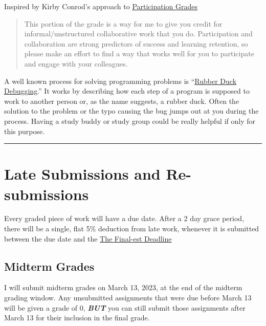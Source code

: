 \documentclass[
  letterpaper,
  DIV=11,
  numbers=noendperiod]{scrartcl}
\begin{document}
Inspired by Kirby Conrod's approach to
\href{https://kconrod.medium.com/new-ways-of-encouraging-and-assessing-participation-81928518e518}{Participation
Grades}

\begin{quote}
This portion of the grade is a way for me to give you credit for
informal/unstructured collaborative work that you do. Participation and
collaboration are strong predictors of success and learning retention,
so please make an effort to find a way that works well for you to
participate and engage with your colleagues.
\end{quote}

A well known process for solving programming problems is
``\href{https://en.wikipedia.org/w/index.php?title=Rubber_duck_debugging\&oldid=1111165654}{Rubber
Duck Debugging}.'' It works by describing how each step of a program is
supposed to work to another person or, as the name suggests, a rubber
duck. Often the solution to the problem or the typo causing the bug
jumps out at you during the process. Having a study buddy or study group
could be really helpful if only for this purpose.

\begin{center}\rule{0.5\linewidth}{0.5pt}\end{center}

\hypertarget{late-submissions-and-re-submissions}{%
\section{Late Submissions and
Re-submissions}\label{late-submissions-and-re-submissions}}

Every graded piece of work will have a due date. After a 2 day grace
period, there will be a single, flat 5\% deduction from late work,
whenever it is submitted between the due date and the
\protect\hyperlink{the-final-est-deadline}{The Final-est Deadline}

\hypertarget{midterm-grades}{%
\subsection{Midterm Grades}\label{midterm-grades}}

I will submit midterm grades on March 13, 2023, at the end of the
midterm grading window. Any unsubmitted assignments that were due before
March 13 will be given a grade of 0, \textbf{\emph{BUT}} you can still
submit those assignments after March 13 for their inclusion in the final
grade.
\end{document}
